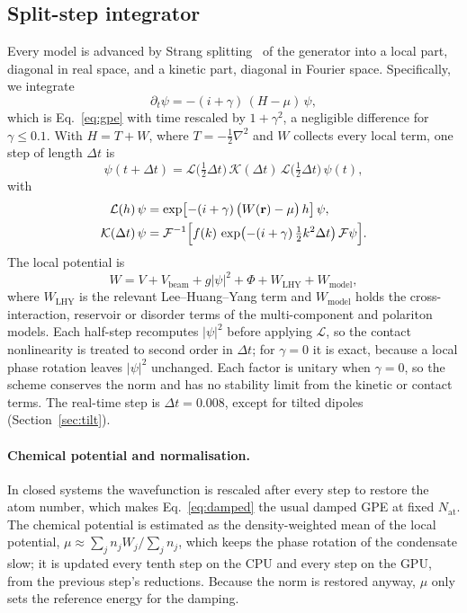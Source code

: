 \documentclass[11pt,a4paper]{article}
\begin{document}
\subsection{Split-step integrator}

Every model is advanced by Strang splitting~\cite{strang,bao} of the generator into a local part, diagonal in real space, and a kinetic part, diagonal in Fourier space. Specifically, we integrate
\begin{equation}
\partial_t\psi=-(i+\gamma)\,(H-\mu)\,\psi,
\label{eq:damped}
\end{equation}
which is Eq.~\eqref{eq:gpe} with time rescaled by $1+\gamma^2$, a negligible difference for $\gamma\le0.1$. With $H=T+W$, where $T=-\tfrac12\nabla^2$ and $W$ collects every local term, one step of length $\Delta t$ is
\begin{equation}
\psi(t+\Delta t)=\mathcal L\bigl(\tfrac12\Delta t\bigr)\,\mathcal K(\Delta t)\,\mathcal L\bigl(\tfrac12\Delta t\bigr)\,\psi(t),
\end{equation}
with
\begin{align}
\mathcal L(h)\,\psi &= \exp\bigl[-(i+\gamma)\,\bigl(W(\mathbf r)-\mu\bigr)\,h\bigr]\,\psi, \\
\mathcal K(\Delta t)\,\psi &= \mathcal F^{-1}\Bigl[f(k)\,\exp\bigl(-(i+\gamma)\,\tfrac12k^2\Delta t\bigr)\,\mathcal F\psi\Bigr].
\end{align}
The local potential is
\begin{equation}
W = V + V_{\mathrm{beam}} + g|\psi|^2 + \Phi + W_{\mathrm{LHY}} + W_{\mathrm{model}},
\end{equation}
where $W_{\mathrm{LHY}}$ is the relevant Lee--Huang--Yang term and $W_{\mathrm{model}}$ holds the cross-interaction, reservoir or disorder terms of the multi-component and polariton models. Each half-step recomputes $|\psi|^2$ before applying $\mathcal L$, so the contact nonlinearity is treated to second order in $\Delta t$; for $\gamma=0$ it is exact, because a local phase rotation leaves $|\psi|^2$ unchanged. Each factor is unitary when $\gamma=0$, so the scheme conserves the norm and has no stability limit from the kinetic or contact terms. The real-time step is $\Delta t=0.008$, except for tilted dipoles (Section~\ref{sec:tilt}).

\paragraph{Chemical potential and normalisation.} In closed systems the wavefunction is rescaled after every step to restore the atom number, which makes Eq.~\eqref{eq:damped} the usual damped GPE at fixed $N_{\mathrm{at}}$. The chemical potential is estimated as the density-weighted mean of the local potential, $\mu\approx\sum_j n_jW_j/\sum_jn_j$, which keeps the phase rotation of the condensate slow; it is updated every tenth step on the CPU and every step on the GPU, from the previous step's reductions. Because the norm is restored anyway, $\mu$ only sets the reference energy for the damping.
\end{document}
